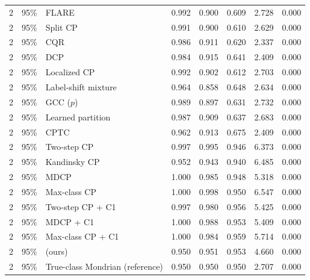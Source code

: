 \begin{longtable}{llp{4cm}ccccc}
\midrule
2 & 95\% & FLARE & 0.992 & 0.900 & 0.609 & 2.728 & 0.000 \\
2 & 95\% & Split CP & 0.991 & 0.900 & 0.610 & 2.629 & 0.000 \\
2 & 95\% & CQR & 0.986 & 0.911 & 0.620 & 2.337 & 0.000 \\
2 & 95\% & DCP & 0.984 & 0.915 & 0.641 & 2.409 & 0.000 \\
2 & 95\% & Localized CP & 0.992 & 0.902 & 0.612 & 2.703 & 0.000 \\
2 & 95\% & Label-shift mixture & 0.964 & 0.858 & 0.648 & 2.634 & 0.000 \\
2 & 95\% & GCC ($p$) & 0.989 & 0.897 & 0.631 & 2.732 & 0.000 \\
2 & 95\% & Learned partition & 0.987 & 0.909 & 0.637 & 2.683 & 0.000 \\
2 & 95\% & CPTC & 0.962 & 0.913 & 0.675 & 2.409 & 0.000 \\
2 & 95\% & Two-step CP & 0.997 & 0.995 & 0.946 & 6.373 & 0.000 \\
2 & 95\% & Kandinsky CP & 0.952 & 0.943 & 0.940 & 6.485 & 0.000 \\
2 & 95\% & MDCP & 1.000 & 0.985 & 0.948 & 5.318 & 0.000 \\
2 & 95\% & Max-class CP & 1.000 & 0.998 & 0.950 & 6.547 & 0.000 \\
2 & 95\% & Two-step CP + C1 & 0.997 & 0.980 & 0.956 & 5.425 & 0.000 \\
2 & 95\% & MDCP + C1 & 1.000 & 0.988 & 0.953 & 5.409 & 0.000 \\
2 & 95\% & Max-class CP + C1 & 1.000 & 0.984 & 0.959 & 5.714 & 0.000 \\
2 & 95\% & \gamut{} (ours) & 0.950 & 0.951 & 0.953 & 4.660 & 0.000 \\
2 & 95\% & True-class Mondrian (reference) & 0.950 & 0.950 & 0.950 & 2.707 & 0.000 \\
\midrule
\bottomrule
\end{longtable}
\par\endgroup

